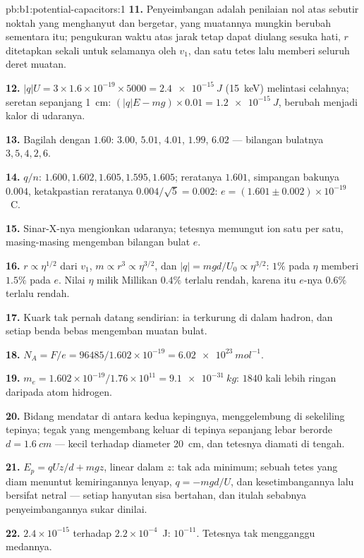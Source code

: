 \begin{solution}{pb:b1:potential-capacitors:1}
\textbf{11.} Penyeimbangan adalah penilaian nol atas sebutir noktah yang menghanyut dan
bergetar, yang muatannya mungkin berubah sementara itu; pengukuran waktu atas jarak tetap dapat
diulang sesuka hati, $r$ ditetapkan sekali untuk selamanya oleh $v_1$, dan satu tetes lalu
memberi seluruh deret muatan.

\textbf{12.} $|q|U = 3 \times 1.6 \times 10^{-19} \times 5000 = \qty{2.4e-15}{J}$
(\qty{15}{keV}) melintasi celahnya; seretan sepanjang \qty{1}{cm}: $(|q|E - mg) \times 0.01 =
\qty{1.2e-15}{J}$, berubah menjadi kalor di udaranya.

\textbf{13.} Bagilah dengan $1.60$: $3.00$, $5.01$, $4.01$, $1.99$, $6.02$ ---
bilangan bulatnya $3, 5, 4, 2, 6$.

\textbf{14.} $q/n$: $1.600, 1.602, 1.605, 1.595, 1.605$; reratanya $1.601$,
simpangan bakunya $0.004$, ketakpastian reratanya $0.004/\sqrt5 =
0.002$: $e = (1.601 \pm 0.002) \times 10^{-19}$~C.

\textbf{15.} Sinar-X-nya mengionkan udaranya; tetesnya memungut ion satu per
satu, masing-masing mengemban bilangan bulat $e$.

\textbf{16.} $r \propto \eta^{1/2}$ dari $v_1$, $m \propto r^3 \propto \eta^{3/2}$, dan
$|q| = mgd/U_0 \propto \eta^{3/2}$: $1\%$ pada $\eta$ memberi $1.5\%$ pada $e$. Nilai $\eta$
milik Millikan $0.4\%$ terlalu rendah, karena itu $e$-nya $0.6\%$ terlalu rendah.

\textbf{17.} Kuark tak pernah datang sendirian: ia terkurung di dalam hadron,
dan setiap benda bebas mengemban muatan bulat.

\textbf{18.} $N_A = F/e = 96485/1.602 \times 10^{-19} = \qty{6.02e23}{mol^{-1}}$.

\textbf{19.} $m_e = 1.602 \times 10^{-19}/1.76 \times 10^{11} = \qty{9.1e-31}{kg}$: $1840$
kali lebih ringan daripada atom hidrogen.

\textbf{20.} Bidang mendatar di antara kedua kepingnya, menggelembung di sekeliling
tepinya;  tegak yang mengembang keluar di tepinya sepanjang lebar
berorde $d = \qty{1.6}{cm}$ --- kecil terhadap diameter \qty{20}{cm}, dan
tetesnya diamati di tengah.

\textbf{21.} $E_p = qUz/d + mgz$, linear dalam $z$: tak ada minimum; sebuah tetes
yang diam menuntut kemiringannya lenyap, $q = -mgd/U$, dan kesetimbangannya
lalu bersifat netral --- setiap hanyutan sisa bertahan, dan itulah sebabnya
penyeimbangannya sukar dinilai.

\textbf{22.} $2.4 \times 10^{-15}$ terhadap $2.2 \times 10^{-4}$~J: $10^{-11}$. Tetesnya
tak mengganggu medannya.


\end{solution}
